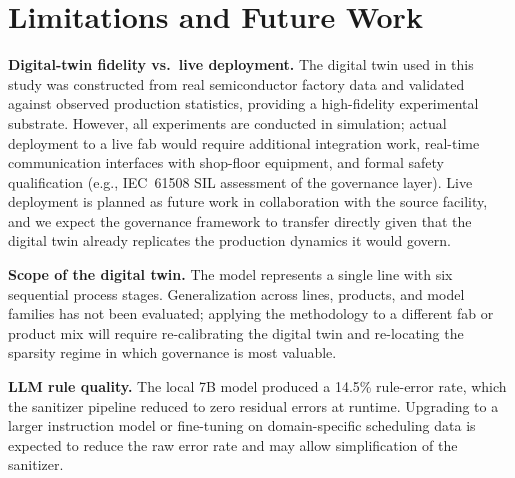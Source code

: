 \documentclass[10pt]{article}
\begin{document}
\section{Limitations and Future Work}
\label{sec:limitations}

\textbf{Digital-twin fidelity vs.\ live deployment.}
The digital twin used in this study was constructed from real semiconductor
factory data and validated against observed production statistics, providing
a high-fidelity experimental substrate.
However, all experiments are conducted in simulation; actual deployment to a
live fab would require additional integration work, real-time communication
interfaces with shop-floor equipment, and formal safety qualification
(e.g., IEC~61508 SIL assessment of the governance layer).
Live deployment is planned as future work in collaboration with the source
facility, and we expect the governance framework to transfer directly given
that the digital twin already replicates the production dynamics it would govern.

\textbf{Scope of the digital twin.}
The model represents a single line with six sequential process stages.
Generalization across lines, products, and model families has not been evaluated;
applying the methodology to a different fab or product mix will require
re-calibrating the digital twin and re-locating the sparsity regime in which
governance is most valuable.

\textbf{LLM rule quality.}
The local 7B model produced a 14.5\% rule-error rate, which the sanitizer
pipeline reduced to zero residual errors at runtime.
Upgrading to a larger instruction model or fine-tuning on domain-specific
scheduling data is expected to reduce the raw error rate and may allow
simplification of the sanitizer.

\printbibliography
\end{document}
